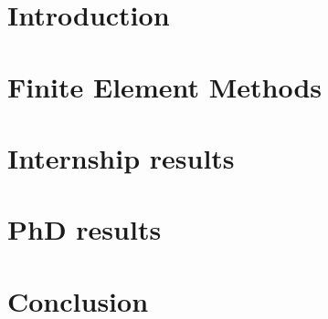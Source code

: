 \documentclass[compress,10pt,xcolor={table,dvipsnames},t]{beamer}
\begin{document}

	\section{Introduction}
    

	\section{Finite Element Methods}
	

    \section{Internship results}
	

    \section{PhD results}
	
	
	\section{Conclusion} %
	
\end{document}
